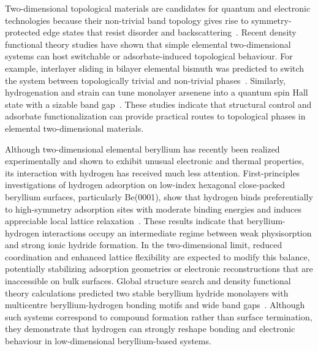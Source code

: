 Two-dimensional topological materials are candidates for quantum and electronic technologies because their non-trivial band topology gives rise to symmetry-protected edge states that resist disorder and backscattering~\cite{weber2024roadmap}.
Recent density functional theory studies have shown that simple elemental two-dimensional systems can host switchable or adsorbate-induced topological behaviour.
For example,
interlayer sliding in bilayer elemental bismuth was predicted to switch the system between topologically trivial and non-trivial phases~\cite{qian2025switchable}.
Similarly,
hydrogenation and strain can tune monolayer arsenene into a quantum spin Hall state with a sizable band gap~\cite{zhang2016controllable}.
These studies indicate that structural control and adsorbate functionalization can provide practical routes to topological phases in elemental two-dimensional materials.

Although two-dimensional elemental beryllium has recently been realized experimentally and shown to exhibit unusual electronic and thermal properties,
its interaction with hydrogen has received much less attention.
First-principles investigations of hydrogen adsorption on low-index hexagonal close-packed beryllium surfaces,
particularly Be(0001),
show that hydrogen binds preferentially to high-symmetry adsorption sites with moderate binding energies and induces appreciable local lattice relaxation~\cite{bachurin2015ab}.
These results indicate that beryllium-hydrogen interactions occupy an intermediate regime between weak physisorption and strong ionic hydride formation.
In the two-dimensional limit,
reduced coordination and enhanced lattice flexibility are expected to modify this balance,
potentially stabilizing adsorption geometries or electronic reconstructions that are inaccessible on bulk surfaces.
Global structure search and density functional theory calculations predicted two stable beryllium hydride monolayers with multicentre beryllium-hydrogen bonding motifs and wide band gaps~\cite{li2018global}.
Although such systems correspond to compound formation rather than surface termination,
they demonstrate that hydrogen can strongly reshape bonding and electronic behaviour in low-dimensional beryllium-based systems.

